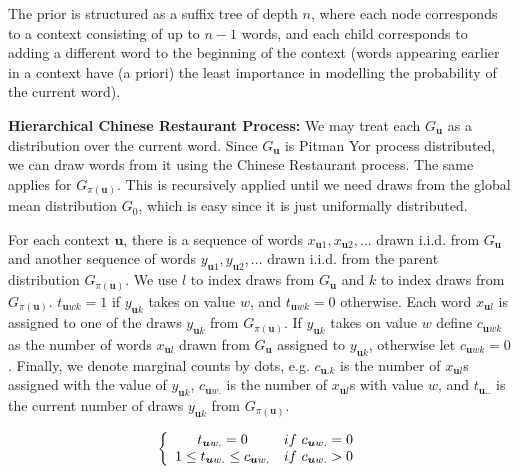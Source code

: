 The prior is structured as a suffix tree of depth $n$, where each node corresponds to a context consisting of up to $n-1$ words, and each child corresponds to adding a different word to the beginning of the context (words appearing earlier in a context have (a priori) the least importance in modelling the probability of the current word).

\textbf{Hierarchical Chinese Restaurant Process:} We may treat each $G_{\boldsymbol{u}}$ as a distribution over the current word. Since $G_{\boldsymbol{u}}$ is Pitman Yor process distributed, we can draw words from it using the Chinese Restaurant process. The same applies for $G_{\pi(\boldsymbol{u})}$. This is recursively applied until we need draws from the global mean distribution $G_{0}$, which is easy since it is just uniformally distributed.

For each context $\boldsymbol{u}$, there is a sequence of words $x_{\boldsymbol{u}1}, x_{\boldsymbol{u}2}, ...$ drawn i.i.d. from $G_{\boldsymbol{u}}$ and another sequence of words $y_{\boldsymbol{u}1}, y_{\boldsymbol{u}2}, ...$ drawn i.i.d. from the parent distribution $G_{\pi(\boldsymbol{u})}$. We use $l$ to index draws from $G_{\boldsymbol{u}}$ and $k$ to index draws from $G_{\pi(\boldsymbol{u})}$. $t_{\boldsymbol{u}wk}=1$ if $y_{\boldsymbol{u}k}$ takes on value $w$, and $t_{\boldsymbol{u}wk}=0$ otherwise. Each word $x_{\boldsymbol{u}l}$ is assigned to one of the draws $y_{\boldsymbol{u}k}$ from $G_{\pi(\boldsymbol{u})}$. If $y_{\boldsymbol{u}k}$ takes on value $w$ define $c_{\boldsymbol{u}wk}$ as the number of words $x_{\boldsymbol{u}l}$ drawn from $G_{\boldsymbol{u}}$ assigned to $y_{\boldsymbol{u}k}$, otherwise let $c_{\boldsymbol{u}wk}=0$. Finally, we denote marginal counts by dots, e.g. $c_{\boldsymbol{u}.k}$ is the number of $x_{\boldsymbol{u}l}$s assigned with the value of $y_{\boldsymbol{u}k}$, $c_{\boldsymbol{u}w.}$ is the number of $x_{\boldsymbol{u}l}$s with value $w$, and $t_{\boldsymbol{u}..}$ is the current number of draws $y_{\boldsymbol{u}k}$ from $G_{\pi(\boldsymbol{u})}$.

\begin{equation}
\left \{ \begin{array} {c c} t_{\boldsymbol{u}w.}=0 & if\ c_{\boldsymbol{u}w.}=0 \\
1\leq t_{\boldsymbol{u}w.} \leq c_{\boldsymbol{u}w.} & if\ c_{\boldsymbol{u}w.}>0
\end{array}
\right.
\label{eq:hierarchicalChineseRestaurantT}
\end{equation}

